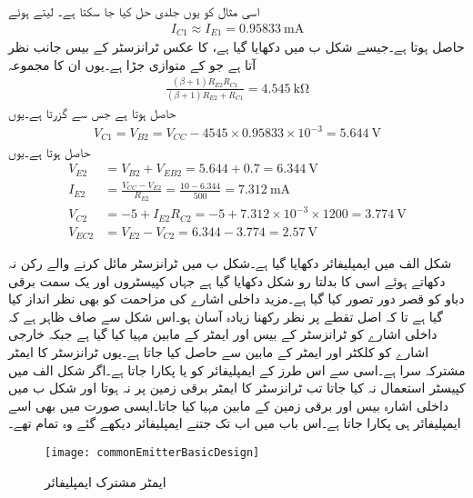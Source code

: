 اسی مثال کو یوں جلدی حل کیا جا سکتا ہے۔ لیتے ہوئے
\begin{align*}
I_{C1} \approx I_{E1}=\SI{0.95833}{\milli \ampere}
\end{align*}
حاصل ہوتا ہے۔جیسے شکل  ب میں دکھایا گیا ہے،  کا عکس ٹرانزسٹر  کے بیس جانب  نظر آتا ہے جو  کے متوازی جڑا ہے۔یوں ان کا مجموعہ
\begin{align*}
\frac{\left(\beta+1 \right) R_{E2} R_{C1}}{\left(\beta+1 \right) R_{E2}+R_{C1}}=\SI{4.545}{\kilo \ohm}
\end{align*}
حاصل ہوتا ہے جس سے  گزرتا ہے۔یوں
\begin{align*}
V_{C1}=V_{B2}=V_{CC}-4545 \times 0.95833 \times 10^{-3}=\SI{5.644}{\volt}
\end{align*}
حاصل ہوتا ہے۔یوں
\begin{align*}
V_{E2}&=V_{B2}+V_{EB2}=5.644+0.7=\SI{6.344}{\volt}\\
I_{E2}&=\frac{V_{CC}-V_{E2}}{R_{E2}}=\frac{10-6.344}{500}=\SI{7.312}{\milli \ampere}\\
V_{C2}&=-5+I_{E2} R_{C2}=-5+7.312 \times 10^{-3} \times 1200=\SI{3.774}{\volt}\\
V_{EC2}&=V_{E2}-V_{C2}=6.344-3.774=\SI{2.57}{\volt}
\end{align*}



شکل  الف   میں ایمپلیفائر دکھایا گیا ہے۔شکل  ب میں ٹرانزسٹر مائل کرنے والے رکن نہ دکھاتے ہوئے اسی کا بدلتا رو شکل دکھایا گیا ہے جہاں کپیسٹروں اور یک سمت برقی دباو  کو قصر دور تصور کیا گیا ہے۔مزید داخلی اشارے کی مزاحمت  کو بھی نظر انداز کیا گیا ہے تا کہ اصل تقطے پر نظر رکھنا زیادہ آسان ہو۔اس شکل سے صاف ظاہر ہے کہ داخلی اشارے کو ٹرانزسٹر کے بیس  اور ایمٹر  کے مابین مہیا کیا گیا ہے جبکہ خارجی اشارے کو کلکٹر   اور ایمٹر  کے مابین سے حاصل کیا جاتا ہے۔یوں ٹرانزسٹر کا ایمٹر  مشترکہ سرا ہے۔اسی سے اس طرز کے ایمپلیفائر کو  یا  پکارا جاتا ہے۔اگر شکل  الف   میں کپیسٹر  استعمال نہ کیا جاتا تب ٹرانزسٹر کا ایمٹر برقی زمین پر نہ ہوتا اور شکل  ب میں داخلی اشارہ بیس اور برقی زمین کے مابین مہیا کیا جاتا۔ایسی صورت میں بھی اسے  ایمپلیفائر ہی پکارا جاتا ہے۔اس باب میں اب تک جتنے ایمپلیفائر دیکھے گئے وہ تمام  تھے۔
\begin{figure}
\centering
\texttt{[image: commonEmitterBasicDesign]}
\caption{ایمٹر مشترک ایمپلیفائر}
\label{شکل_دو_جوڑ_ٹرانزسٹر_مشترکہ_مخارج_ایمپلیفائر}
\end{figure}

